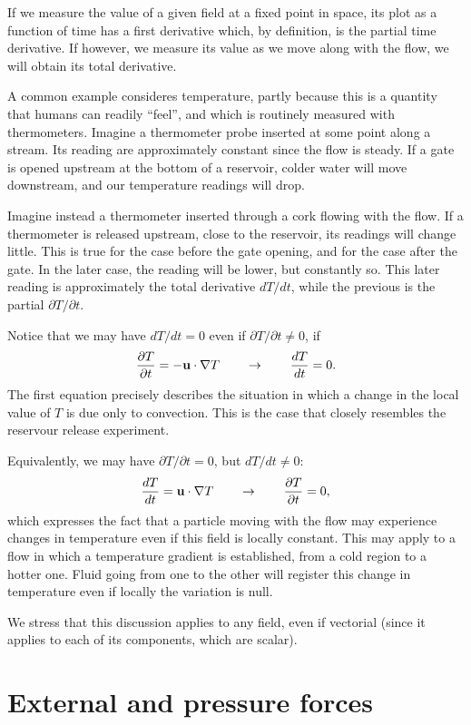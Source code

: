 If we measure the value of a given field at a fixed point in space,
its plot as a function of time has a first derivative which, by
definition, is the partial time derivative. If however, we measure
its value as we move along with the flow, we will obtain its total
derivative.

A common example consideres temperature, partly because this is a
quantity that humans can readily ``feel'', and which is routinely
measured with thermometers. Imagine a thermometer probe inserted at
some point along a stream. Its reading are approximately constant
since the flow is steady. If a gate is opened upstream at the bottom
of a reservoir, colder water will move downstream, and our temperature
readings will drop.

Imagine instead a thermometer inserted through a cork flowing with the
flow. If a thermometer is released upstream, close to the reservoir,
its readings will change little. This is true for the case before the
gate opening, and for the case after the gate. In the later case, the
reading will be lower, but constantly so. This later reading is
approximately the total derivative $dT/dt$, while the previous is the
partial $\partial T / \partial t$.

Notice that we may have $dT/dt = 0$ even if $\partial T / \partial t
\ne 0$, if
\[
\frac{\partial T }{ \partial t} = - \mathbf{u} \cdot \nabla T
\qquad\to\qquad
\frac{d T }{d t} = 0 .
\]
The first equation precisely describes the situation in which a change
in the local value of $T$ is due only to convection. This is the
case that closely resembles the reservour release experiment.

Equivalently, we may have $\partial T / \partial t = 0$, but $dT/dt
\ne 0$:
\[
\frac{d T }{d t} = \mathbf{u} \cdot \nabla T
\qquad\to\qquad
\frac{\partial T }{\partial t} = 0 ,
\]
which expresses the fact that a particle moving with the flow may
experience changes in temperature even if this field is locally
constant. This may apply to a flow in which a temperature gradient is
established, from a cold region to a hotter one. Fluid going from one
to the other will register this change in temperature even if
locally the variation is null.

We stress that this discussion applies to any field, even if vectorial
(since it applies to each of its components, which are scalar).



\section{External and pressure forces}

